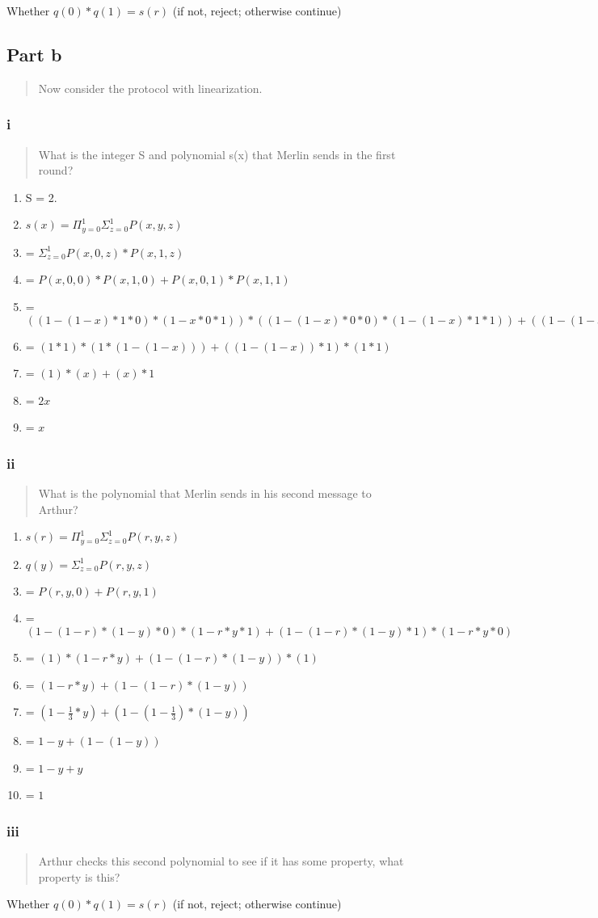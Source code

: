 \documentclass{article}
\begin{document}
Whether $q(0)*q(1)=s(r)$ (if not, reject; otherwise continue)

\bigskip

\subsection{Part b}
\begin{quote}
Now consider the protocol with linearization.
\end{quote}

\subsubsection{i}
\begin{quote}
What is the integer S and polynomial s(x) that  Merlin  sends  in  the  first round?
\end{quote}

\begin{enumerate}[label=]
\item S = 2.
\item $s(x) = \Pi_{y=0}^1 \Sigma_{z=0}^1 P(x,y,z)$
\item = $\Sigma_{z=0}^1 P(x,0,z) * P(x,1,z)$
\item = $P(x,0,0) * P(x,1,0) + P(x,0,1) * P(x,1,1)$
\item = $((1-(1-x)*1*0) * (1-x*0*1)) * ((1-(1-x)*0*0) * (1-(1-x)*1*1)) + ((1-(1-x)*1*1) * (1-x*0*0)) * ((1-(1-x)*0*1) * (1-(1-x)*1*0))$
\item = $(1*1)*(1*(1-(1-x))) + ((1-(1-x))*1)*(1*1)$
\item = $(1)*(x) + (x)*1$
\item = $2x$
\item = $x$
\end{enumerate}

\subsubsection{ii}
\begin{quote}
What is the polynomial that Merlin sends in his second message to Arthur? 
\end{quote}

\begin{enumerate}[label=]
\item $s(r) = \Pi_{y=0}^1 \Sigma_{z=0}^1 P(r,y,z)$
\item $q(y) = \Sigma_{z=0}^1 P(r,y,z)$
\item = $P(r,y,0) + P(r,y,1)$
\item = $(1-(1-r)*(1-y)*0) * (1-r*y*1) + (1-(1-r)*(1-y)*1) * (1-r*y*0)$
\item = $(1)*(1-r*y) + (1-(1-r)*(1-y))*(1)$
\item = $(1-r*y) + (1-(1-r)*(1-y))$
\item = $(1-\frac13*y) + (1-(1-\frac13)*(1-y))$
\item = $1-y + (1-(1-y))$
\item = $1-y + y$
\item = $1$
\end{enumerate}

\subsubsection{iii}
\begin{quote}
Arthur  checks  this  second  polynomial  to  see  if  it  has  some  property,  what property is this?
\end{quote}

Whether $q(0)*q(1)=s(r)$ (if not, reject; otherwise continue)
\end{document}
